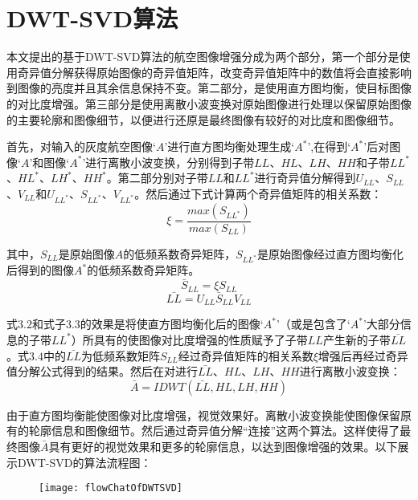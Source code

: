 	\section{DWT-SVD算法}本文提出的基于DWT-SVD算法的航空图像增强分成为两个部分，第一个部分是使用奇异值分解获得原始图像的奇异值矩阵，改变奇异值矩阵中的数值将会直接影响到图像的亮度并且其余信息保持不变\cite{improved...}。第二部分，是使用直方图均衡，使目标图像的对比度增强。第三部分是使用离散小波变换对原始图像进行处理以保留原始图像的主要轮廓和图像细节，以便进行还原是最终图像有较好的对比度和图像细节。

首先，对输入的灰度航空图像‘$A$’进行直方图均衡处理生成‘$A^*$’,在得到‘$A^*$’后对图像‘$A$’和图像‘$A^*$’进行离散小波变换，分别得到子带$LL$、$HL$、$LH$、$HH$和子带$LL^*$、$HL^*$、$LH^*$、$HH^*$。第二部分别对子带$LL$和$LL^*$进行奇异值分解得到$U_{LL}$、$S_{LL}$、$V_{LL}$和$U_ {LL^*}$、$S_{LL^*}$、$V_{LL^*}$。然后通过下式计算两个奇异值矩阵的相关系数：
\begin{equation}     \xi = \frac{max \left( S_{LL^*} \right) }{ max \left( S_{LL} \right) }    \end{equation}

其中，$S_{LL}$是原始图像$A$的低频系数奇异矩阵，$S_{LL^*}$是原始图像经过直方图均衡化后得到的图像$A^*$的低频系数奇异矩阵。
\begin{equation}     \bar{S}_{LL} = \xi S_{LL}    \end{equation}
\begin{equation}     \bar{LL} =  U_{LL} \bar{S}_{LL} V_{LL} \end{equation}

式$3.2$和式子$3.3$的效果是将使直方图均衡化后的图像‘$A^*$’（或是包含了‘$A^*$’大部分信息的子带$LL^*$）所具有的使图像对比度增强的性质赋予了子带$LL$产生新的子带$\bar{LL}$。式$3.4$中的$\bar{LL}$为低频系数矩阵$S_{LL}$经过奇异值矩阵的相关系数$\xi$增强后再经过奇异值分解公式得到的结果。然后在对进行$\bar{LL}$、$HL$、$LH$、$HH$进行离散小波变换：
\begin{equation}     \bar{A} = IDWT(\bar{LL},HL,LH,HH)    \end{equation}

由于直方图均衡能使图像对比度增强，视觉效果好。离散小波变换能使图像保留原有的轮廓信息和图像细节。然后通过奇异值分解“连接”这两个算法。这样使得了最终图像$\bar{A}$具有更好的视觉效果和更多的轮廓信息，以达到图像增强的效果。以下展示DWT-SVD的算法流程图：

\begin{figure}[!htbp]
    \centering
    \texttt{[image: flowChatOfDWTSVD]}
    \label{fig:tc_q_criteria}
\end{figure}

